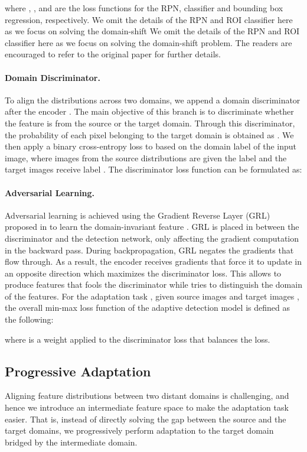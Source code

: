 \documentclass[10pt,twocolumn,letterpaper]{article}
\begin{document}
where , , and  are the loss functions for the RPN, classifier and bounding box regression, respectively.
We omit the details of the RPN and ROI classifier here as we focus on solving the domain-shift We omit the details of the RPN and ROI classifier here as we focus on solving the domain-shift problem. The readers are encouraged to refer to the original paper \cite{Ren_2017} for further details.

\vspace{-2mm}\paragraph{Domain Discriminator.}
To align the distributions across two domains, we append a domain discriminator  after the encoder .
The main objective of this branch is to discriminate whether the feature  is from the source or the target domain.
Through this discriminator, the probability of each pixel belonging to the target domain is obtained as .
We then apply a binary cross-entropy loss to  based on the domain label  of the input image,
where images from the source distributions are given the label  and the target images receive label .
The discriminator loss function  can be formulated as:



\vspace{-2mm}\paragraph{Adversarial Learning.} 
Adversarial learning is achieved using the Gradient Reverse Layer (GRL) proposed in \cite{ganin2015unsupervised} to learn the domain-invariant feature .
GRL is placed in between the discriminator and the detection network, only affecting the gradient computation in the backward pass.
During backpropagation, GRL negates the gradients that flow through.
As a result, the encoder  receives gradients that force it to update in an opposite direction which maximizes the discriminator loss.
This allows  to produce features that fools the discriminator  while  tries to distinguish the domain of the features.
For the adaptation task , given source images  and target images , the overall min-max loss function of the adaptive detection model is defined as the following:

where  is a weight applied to the discriminator loss that balances the loss. 

\subsection{Progressive Adaptation}
Aligning feature distributions between two distant domains is challenging, and hence we introduce an intermediate feature space to make the adaptation task easier.
That is, instead of directly solving the gap between the source and the target domains, we progressively perform adaptation to the target domain bridged by the intermediate domain.
\end{document}
